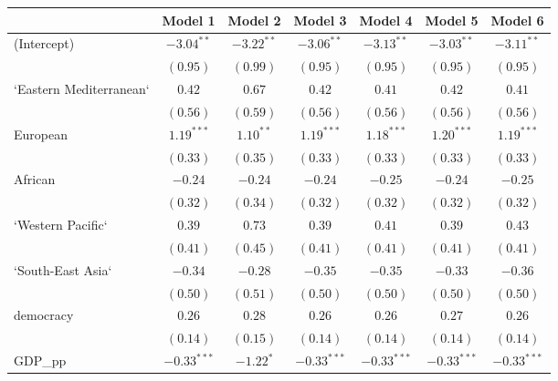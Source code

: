 
\begin{table}[!h]
\begin{center}
\begin{tabular}{l c c c c c c }
\toprule
 & Model 1 & Model 2 & Model 3 & Model 4 & Model 5 & Model 6 \\
\midrule
(Intercept)             & $-3.04^{**}$  & $-3.22^{**}$ & $-3.06^{**}$  & $-3.13^{**}$  & $-3.03^{**}$  & $-3.11^{**}$  \\
                        & $(0.95)$      & $(0.99)$     & $(0.95)$      & $(0.95)$      & $(0.95)$      & $(0.95)$      \\
`Eastern Mediterranean` & $0.42$        & $0.67$       & $0.42$        & $0.41$        & $0.42$        & $0.41$        \\
                        & $(0.56)$      & $(0.59)$     & $(0.56)$      & $(0.56)$      & $(0.56)$      & $(0.56)$      \\
European                & $1.19^{***}$  & $1.10^{**}$  & $1.19^{***}$  & $1.18^{***}$  & $1.20^{***}$  & $1.19^{***}$  \\
                        & $(0.33)$      & $(0.35)$     & $(0.33)$      & $(0.33)$      & $(0.33)$      & $(0.33)$      \\
African                 & $-0.24$       & $-0.24$      & $-0.24$       & $-0.25$       & $-0.24$       & $-0.25$       \\
                        & $(0.32)$      & $(0.34)$     & $(0.32)$      & $(0.32)$      & $(0.32)$      & $(0.32)$      \\
`Western Pacific`       & $0.39$        & $0.73$       & $0.39$        & $0.41$        & $0.39$        & $0.43$        \\
                        & $(0.41)$      & $(0.45)$     & $(0.41)$      & $(0.41)$      & $(0.41)$      & $(0.41)$      \\
`South-East Asia`       & $-0.34$       & $-0.28$      & $-0.35$       & $-0.35$       & $-0.33$       & $-0.36$       \\
                        & $(0.50)$      & $(0.51)$     & $(0.50)$      & $(0.50)$      & $(0.50)$      & $(0.50)$      \\
democracy               & $0.26$        & $0.28$       & $0.26$        & $0.26$        & $0.27$        & $0.26$        \\
                        & $(0.14)$      & $(0.15)$     & $(0.14)$      & $(0.14)$      & $(0.14)$      & $(0.14)$      \\
GDP\_pp                 & $-0.33^{***}$ & $-1.22^{*}$  & $-0.33^{***}$ & $-0.33^{***}$ & $-0.33^{***}$ & $-0.33^{***}$ \\

\end{tabular}
\end{center}
\end{table}
